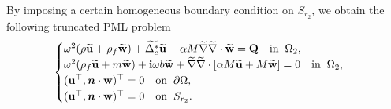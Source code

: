 \documentclass[11pt]{article}
\newcommand{\pa}{\partial}
\newcommand{\Om}{\Omega}
\newcommand{\De}{\Delta}
\newcommand{\wid}{\widetilde}
\newcommand{\bs}{\boldsymbol}
\begin{document}
By imposing a certain homogeneous boundary condition on $S_{r_2}$, we obtain the following truncated PML problem
\begin{equation}\label{poromodifiedPML}
\begin{cases}
\omega^2(\rho\wid{\mathbf{u}} +\rho_f \wid{\mathbf{w}})+\wid{\De_c^*}\wid{\mathbf{u}} +\alpha M\wid{\nabla} 
\wid{\nabla}\cdot  \wid{\mathbf{w}}=\mathbf{Q}\quad {\rm in}\;\;\Om_2,\\
\omega^2(\rho_f \wid{\mathbf{u}}+m \wid{\mathbf{w}})+{\bf{i}}\omega b \wid{\mathbf{w}}+\wid{\nabla} \wid{\nabla} 
\cdot [\alpha M \wid{\mathbf{u}}+ M \wid{\mathbf{w}}]=0 \quad {\rm in}\;\;\Om_2,\\
(\mathbf{u}^{\top},	\bs{n}\cdot \mathbf{w})^{\top}=0\quad {\rm on} \;\;\pa \Om,\\
(\mathbf{u}^{\top},	\bs{n}\cdot \mathbf{w})^{\top}=0\quad {\rm on} \;\;S_{r_2}.
\end{cases}
\end{equation} 
\end{document}
